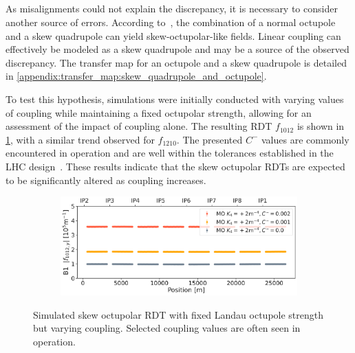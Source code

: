 \FloatBarrier
\subsection{}

As misalignments could not explain the discrepancy, it is necessary to consider another source of
errors. According to~\cite{bazzani_normal_1994}, the combination of a normal octupole and a skew
quadrupole can yield skew-octupolar-like fields. Linear coupling can effectively be modeled as a
skew quadrupole and may be a source of the observed discrepancy. The transfer map for an octupole
and a skew quadrupole is detailed in \cref{appendix:transfer_map:skew_quadrupole_and_octupole}.

To test this hypothesis, simulations were initially conducted with varying values of coupling while
maintaining a fixed octupolar strength, allowing for an assessment of the impact of coupling alone.
The resulting RDT $f_{1012}$ is shown in \cref{fig:skew_octupolar:sim_coupling}, with a similar
trend observed for $f_{1210}$. The presented $C^{-}$ values are commonly encountered in
operation and are well within the tolerances established in the LHC design~\cite{bruning_lhc_2004}.
These results indicate that the skew octupolar RDTs are expected to be significantly altered as
coupling increases.


\begin{figure}[!htb]
    \centering
    \begin{subfigure}{0.8\textwidth}
        \includegraphics[width=\textwidth]{./images/skew_octupoles/f1012_coupling_sim_AMP.pdf}
    \end{subfigure}
    \caption{Simulated skew octupolar RDT with fixed Landau octupole strength but varying coupling.
    Selected coupling values are often seen in operation.}
    \label{fig:skew_octupolar:sim_coupling}
\end{figure}



